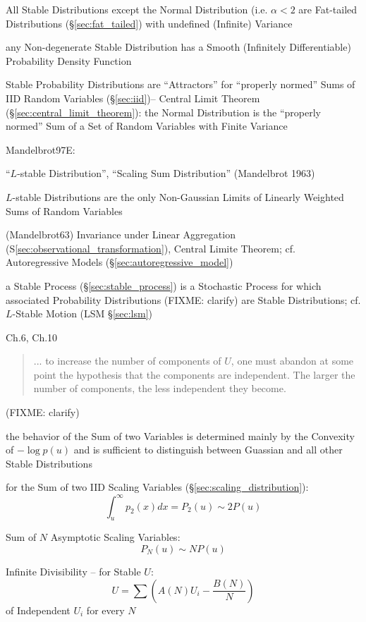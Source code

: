 All Stable Distributions except the Normal Distribution (i.e. $\alpha < 2$ are
Fat-tailed Distributions (\S\ref{sec:fat_tailed}) with undefined (Infinite)
Variance

any Non-degenerate Stable Distribution has a Smooth (Infinitely Differentiable)
Probability Density Function

Stable Probability Distributions are ``Attractors'' for ``properly normed'' Sums
of IID Random Variables (\S\ref{sec:iid})-- Central Limit Theorem
(\S\ref{sec:central_limit_theorem}): the Normal Distribution is the ``properly
normed'' Sum of a Set of Random Variables with Finite Variance

Mandelbrot97E:

``$L$-stable Distribution'', ``Scaling Sum Distribution'' (Mandelbrot 1963)

$L$-stable Distributions are the only Non-Gaussian Limits of Linearly Weighted
Sums of Random Variables

(Mandelbrot63) Invariance under Linear Aggregation
(S\ref{sec:observational_transformation}), Central Limite Theorem; cf.
Autoregressive Models (\S\ref{sec:autoregressive_model})

a Stable Process (\S\ref{sec:stable_process}) is a Stochastic Process for which
associated Probability Distributions (FIXME: clarify) are Stable Distributions;
cf. $L$-Stable Motion (LSM \S\ref{sec:lsm})

Ch.6, Ch.10

\begin{quote}
  ... to increase the number of components of $U$, one must abandon at some
  point the hypothesis that the components are independent. The larger the
  number of components, the less independent they become.
\end{quote}
(FIXME: clarify)

the behavior of the Sum of two Variables is determined mainly by the Convexity
of $-\log p(u)$ and is sufficient to distinguish between Guassian and all other
Stable Distributions

for the Sum of two IID Scaling Variables (\S\ref{sec:scaling_distribution}):
\[
  \int_u^\infty p_2(x) dx = P_2(u) \sim 2 P(u)
\]

Sum of $N$ Asymptotic Scaling Variables:
\[
  P_N(u) \sim N P(u)
\]

Infinite Divisibility -- for Stable $U$:
\[
  U = \sum (A(N) U_i - \frac{B(N)}{N})
\]
of Independent $U_i$ for every $N$

